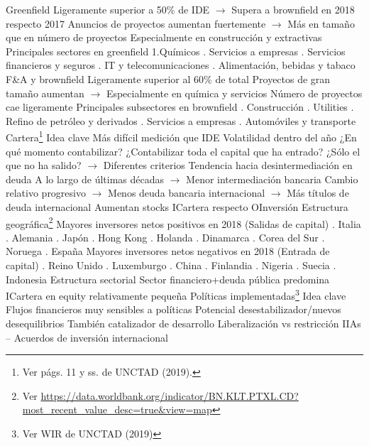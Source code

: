 \documentclass{nuevotema}
\begin{document}
\begin{esquemal}
				\4 Greenfield
				\4[] Ligeramente superior a 50\% de IDE
				\4[] $\to$ Supera a brownfield en 2018 respecto 2017
				\4[] Anuncios de proyectos aumentan fuertemente
				\4[] $\to$ Más en tamaño que en número de proyectos
				\4[] Especialmente en construcción y extractivas
				\4[$\to$] Principales sectores en greenfield
				\4[] 1.Químicos
				. Servicios a empresas
				. Servicios financieros y seguros
				. IT y telecomunicaciones
				. Alimentación, bebidas y tabaco
				\4 F\&A y brownfield
				\4[] Ligeramente superior al 60\% de total
				\4[] Proyectos de gran tamaño aumentan
				\4[] $\to$ Especialmente en química y servicios
				\4[] Número de proyectos cae ligeramente
				\4[$\to$] Principales subsectores en brownfield
				. Construcción
				. Utilities
				. Refino de petróleo y derivados
				. Servicios a empresas
				. Automóviles y transporte
		\2 Cartera\footnote{Ver págs. 11 y ss. de UNCTAD (2019).}
			\3 Idea clave
				\4 Más difícil medición que IDE
				\4 Volatilidad dentro del año
				\4[] ¿En qué momento contabilizar?
				\4[] ¿Contabilizar toda el capital que ha entrado?
				\4[] ¿Sólo el que no ha salido?
				\4[] $\to$ Diferentes criterios
				\4 Tendencia hacia desintermediación en deuda
				\4[] A lo largo de últimas décadas
				\4[] $\to$ Menor intermediación bancaria
				\4[] Cambio relativo progresivo
				\4[] $\to$ Menos deuda bancaria internacional
				\4[] $\to$ Más títulos de deuda internacional
				\4[$\then$] Aumentan stocks ICartera respecto OInversión
			\3 Estructura geográfica\footnote{Ver \url{https://data.worldbank.org/indicator/BN.KLT.PTXL.CD?most_recent_value_desc=true\&view=map}}
				\4 Mayores inversores netos positivos en 2018
				\4[] (Salidas de capital)
				. Italia
				. Alemania
				. Japón
				. Hong Kong
				. Holanda
				. Dinamarca
				. Corea del Sur
				. Noruega
				. España
				\4 Mayores inversores netos negativos en 2018
				\4[] (Entrada de capital)
				. Reino Unido
				. Luxemburgo
				. China
				. Finlandia
				. Nigeria
				. Suecia
				. Indonesia
			\3 Estructura sectorial
				\4 Sector financiero+deuda pública predomina
				\4 ICartera en equity relativamente pequeña
		\2 Políticas implementadas\footnote{Ver WIR de UNCTAD (2019)}
			\3 Idea clave
				\4 Flujos financieros muy sensibles a políticas
				\4 Potencial desestabilizador/nuevos desequilibrios
				\4 También catalizador de desarrollo
			\3 Liberalización vs restricción
			\3 IIAs -- Acuerdos de inversión internacional

\end{esquemal}
\end{document}
